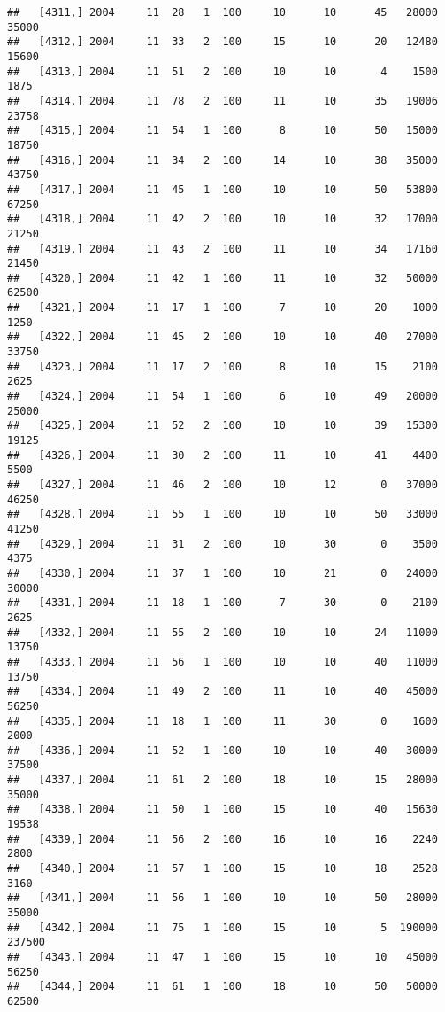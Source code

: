 \documentclass{article}\usepackage[]{graphicx}\usepackage[]{color}
\makeatletter
\newenvironment{kframe}{%
 \def\at@end@of@kframe{}%
 \ifinner\ifhmode%
  \def\at@end@of@kframe{\end{minipage}}%
  \begin{minipage}{\columnwidth}%
 \fi\fi%
 \def\FrameCommand##1{\hskip\@totalleftmargin \hskip-\fboxsep
 \colorbox{shadecolor}{##1}\hskip-\fboxsep
     \hskip-\linewidth \hskip-\@totalleftmargin \hskip\columnwidth}%
 \MakeFramed {\advance\hsize-\width
   \@totalleftmargin\z@ \linewidth\hsize
   \@setminipage}}%
 {\par\unskip\endMakeFramed%
 \at@end@of@kframe}
\newenvironment{knitrout}{}{} %
\makeatother
\begin{document}
\begin{knitrout}
\begin{kframe}
\begin{verbatim}
##   [4311,] 2004     11  28   1  100     10      10      45   28000   35000
##   [4312,] 2004     11  33   2  100     15      10      20   12480   15600
##   [4313,] 2004     11  51   2  100     10      10       4    1500    1875
##   [4314,] 2004     11  78   2  100     11      10      35   19006   23758
##   [4315,] 2004     11  54   1  100      8      10      50   15000   18750
##   [4316,] 2004     11  34   2  100     14      10      38   35000   43750
##   [4317,] 2004     11  45   1  100     10      10      50   53800   67250
##   [4318,] 2004     11  42   2  100     10      10      32   17000   21250
##   [4319,] 2004     11  43   2  100     11      10      34   17160   21450
##   [4320,] 2004     11  42   1  100     11      10      32   50000   62500
##   [4321,] 2004     11  17   1  100      7      10      20    1000    1250
##   [4322,] 2004     11  45   2  100     10      10      40   27000   33750
##   [4323,] 2004     11  17   2  100      8      10      15    2100    2625
##   [4324,] 2004     11  54   1  100      6      10      49   20000   25000
##   [4325,] 2004     11  52   2  100     10      10      39   15300   19125
##   [4326,] 2004     11  30   2  100     11      10      41    4400    5500
##   [4327,] 2004     11  46   2  100     10      12       0   37000   46250
##   [4328,] 2004     11  55   1  100     10      10      50   33000   41250
##   [4329,] 2004     11  31   2  100     10      30       0    3500    4375
##   [4330,] 2004     11  37   1  100     10      21       0   24000   30000
##   [4331,] 2004     11  18   1  100      7      30       0    2100    2625
##   [4332,] 2004     11  55   2  100     10      10      24   11000   13750
##   [4333,] 2004     11  56   1  100     10      10      40   11000   13750
##   [4334,] 2004     11  49   2  100     11      10      40   45000   56250
##   [4335,] 2004     11  18   1  100     11      30       0    1600    2000
##   [4336,] 2004     11  52   1  100     10      10      40   30000   37500
##   [4337,] 2004     11  61   2  100     18      10      15   28000   35000
##   [4338,] 2004     11  50   1  100     15      10      40   15630   19538
##   [4339,] 2004     11  56   2  100     16      10      16    2240    2800
##   [4340,] 2004     11  57   1  100     15      10      18    2528    3160
##   [4341,] 2004     11  56   1  100     10      10      50   28000   35000
##   [4342,] 2004     11  75   1  100     15      10       5  190000  237500
##   [4343,] 2004     11  47   1  100     15      10      10   45000   56250
##   [4344,] 2004     11  61   1  100     18      10      50   50000   62500

\end{verbatim}
\end{kframe}
\end{knitrout}
\end{document}
